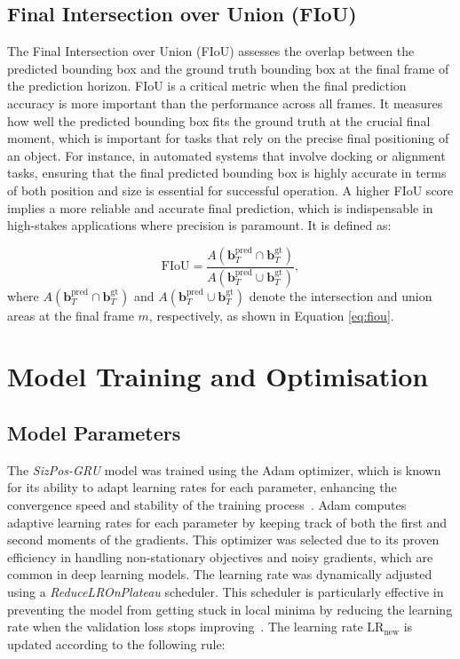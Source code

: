 \documentclass[12pt,oneside]{book} %
\begin{document}
\subsection*{Final Intersection over Union (FIoU)}
\noindent The Final Intersection over Union (FIoU) assesses the overlap between the predicted bounding box and the ground truth bounding box at the final frame of the prediction horizon. FIoU is a critical metric when the final prediction accuracy is more important than the performance across all frames. It measures how well the predicted bounding box fits the ground truth at the crucial final moment, which is important for tasks that rely on the precise final positioning of an object. For instance, in automated systems that involve docking or alignment tasks, ensuring that the final predicted bounding box is highly accurate in terms of both position and size is essential for successful operation. A higher FIoU score implies a more reliable and accurate final prediction, which is indispensable in high-stakes applications where precision is paramount. It is defined as:

\begin{equation}
    \text{FIoU} = \frac{A(\mathbf{b}_T^{\text{pred}} \cap \mathbf{b}_T^{\text{gt}})}{A(\mathbf{b}_T^{\text{pred}} \cup \mathbf{b}_T^{\text{gt}})}, \label{eq:fiou}
\end{equation}
where \(A(\mathbf{b}_T^{\text{pred}} \cap \mathbf{b}_T^{\text{gt}})\) and
\(A(\mathbf{b}_T^{\text{pred}} \cup \mathbf{b}_T^{\text{gt}})\) denote the
intersection and union areas at the final frame \(m\), respectively, as shown
in Equation \eqref{eq:fiou}.

\section{Model Training and Optimisation}
\subsection*{Model Parameters}
\noindent The \textit{SizPos-GRU} model was trained using the Adam optimizer, which is
known for its ability to adapt learning rates for each parameter, enhancing the
convergence speed and stability of the training process~\cite{KingBa15,
    FusionGRU, DBLP:journals/corr/abs-2010-10270}. Adam computes adaptive learning
rates for each parameter by keeping track of both the first and second moments
of the gradients. This optimizer was selected due to its proven efficiency in
handling non-stationary objectives and noisy gradients, which are common in
deep learning models. The learning rate was dynamically adjusted using a
\textit{ReduceLROnPlateau} scheduler. This scheduler is particularly effective
in preventing the model from getting stuck in local minima by reducing the
learning rate when the validation loss stops improving~\cite{FusionGRU,
    DBLP:journals/corr/abs-2010-10270}. The learning rate
\(\text{LR}_{\text{new}}\) is updated according to the following rule:
\end{document}
